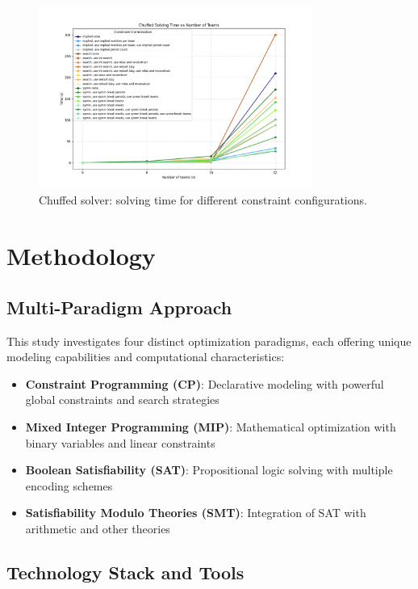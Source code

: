 \documentclass[11pt]{article}
\begin{document}
\begin{itemize}
\begin{figure}[H]
    \centering
    \includegraphics[width=0.8\textwidth]{chuffed_plot.png}
    \caption{Chuffed solver: solving time for different constraint configurations.}
    \label{fig:chuffed_plot}
\end{figure}

\section{Methodology}

\subsection{Multi-Paradigm Approach}

This study investigates four distinct optimization paradigms, each offering unique modeling capabilities and computational characteristics:

\begin{itemize}
    \item \textbf{Constraint Programming (CP)}: Declarative modeling with powerful global constraints and search strategies
    \item \textbf{Mixed Integer Programming (MIP)}: Mathematical optimization with binary variables and linear constraints
    \item \textbf{Boolean Satisfiability (SAT)}: Propositional logic solving with multiple encoding schemes
    \item \textbf{Satisfiability Modulo Theories (SMT)}: Integration of SAT with arithmetic and other theories
\end{itemize}

\subsection{Technology Stack and Tools}


\end{itemize}
\end{document}
